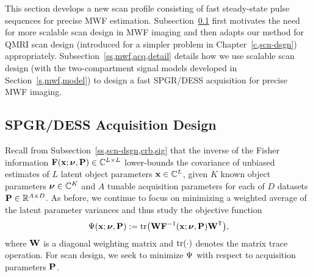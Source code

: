 This section develops a new scan profile
consisting of fast steady-state pulse sequences
for precise MWF estimation.
Subsection~\ref{ss,mwf,acq,design} 
first motivates the need
for more scalable scan design
in MWF imaging 
and then adapts our method 
for QMRI scan design
(introduced for a simpler problem 
in Chapter~\ref{c,scn-dsgn}) appropriately.
Subsection~\ref{ss,mwf,acq,detail}
details how we use scalable scan design
(with the two-compartment signal models developed 
in Section~\ref{s,mwf,model})
to design a fast SPGR/DESS acquisition 
for precise MWF imaging.

\subsection{SPGR/DESS Acquisition Design}
\label{ss,mwf,acq,design}

Recall from Subsection~\ref{ss,scn-dsgn,crb,sig} 
that the inverse 
of the Fisher information 
$\Fisher{\bmx;\bmnu,\bmP} \in \complexes{L \times L}$ 
lower-bounds the covariance
of unbiased estimates 
of $L$ latent object parameters $\mathbf{x} \in \mathbb{C}^{L}$,
given $K$ known object parameters $\boldsymbol{\nu} \in \mathbb{C}^{K}$ 
and $A$ tunable acquisition parameters 
for each of $D$ datasets 
$\mathbf{P} \in \mathbb{R}^{A \times D}$.
As before, we continue to focus 
on minimizing a weighted average 
of the latent parameter variances
and thus study the objective function
\begin{align}
	\costa{\bmx; \bmnu, \bmP} := 
		\trace{\bmW \bmF^{-1}\paren{\bmx;\bmnu,\bmP} \bmW\tpose},
	\label{eq:mwf,cost}
\end{align}
where $\mathbf{W}$ is a diagonal weighting matrix
and $\trace{\cdot}$ denotes the matrix trace operation.
For scan design,
we seek to minimize $\Psi$
with respect to acquisition parameters $\mathbf{P}$.

